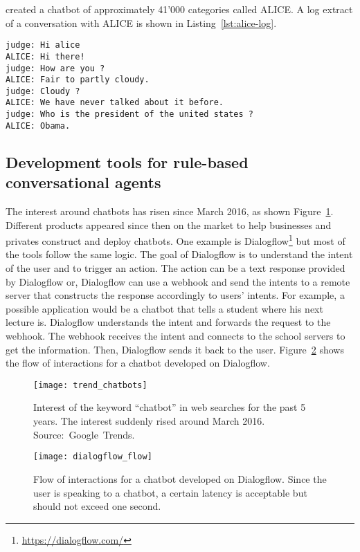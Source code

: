 \citet{wallace2009anatomy} created a chatbot of approximately 41'000 categories called ALICE. A log extract of a conversation with ALICE is shown in Listing~\ref{lst:alice-log}.
\begin{lstlisting}[caption={Example of anonymization},label={lst:alice-log}]
judge: Hi alice
ALICE: Hi there!
judge: How are you ?
ALICE: Fair to partly cloudy.
judge: Cloudy ?
ALICE: We have never talked about it before.
judge: Who is the president of the united states ?
ALICE: Obama.
\end{lstlisting}

\subsection{Development tools for rule-based conversational agents}
The interest around chatbots has risen since March 2016, as shown Figure~\ref{fig:trend_chatbot}. Different products appeared since then on the market to help businesses and privates construct and deploy chatbots. One example is Dialogflow\footnote{\url{https://dialogflow.com/}} but most of the tools follow the same logic. The goal of Dialogflow is to understand the intent of the user and to trigger an action. The action can be a text response provided by Dialogflow or, Dialogflow can use a webhook and send the intents to a remote server that constructs the response accordingly to users' intents.
For example, a possible application would be a chatbot that tells a student where his next lecture is. Dialogflow understands the intent and forwards the request to the webhook. The webhook receives the intent and connects to the school servers to get the information. Then, Dialogflow sends it back to the user. Figure~\ref{fig:dialogflow} shows the flow of interactions for a chatbot developed on Dialogflow.

\begin{figure}[b]
    \centering
    \texttt{[image: trend\_chatbots]}
    \decoRule
    \caption[Web search interest for ``chatbot'']{Interest of the keyword ``chatbot'' in web searches for the past 5 years. The interest suddenly rised around March 2016. Source:~Google~Trends.}
    \label{fig:trend_chatbot}
\end{figure}

\begin{figure}
    \centering
    \texttt{[image: dialogflow\_flow]}
    \decoRule
    \caption[Dialogflow based chatbot]{Flow of interactions for a chatbot developed on Dialogflow. Since the user is speaking to a chatbot, a certain latency is acceptable but should not exceed one second.}
    \label{fig:dialogflow}
\end{figure}


